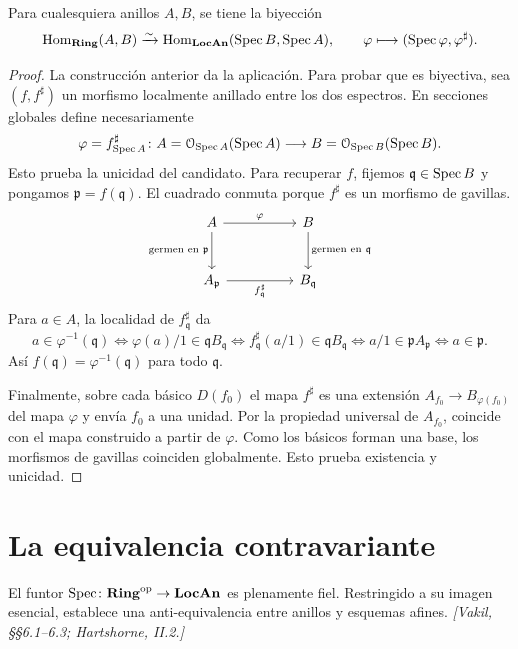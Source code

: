 \begin{teo}
\label{teo:s06-plena-fidelidad}
Para cualesquiera anillos $A,B$, se tiene la biyección
\[
\operatorname{Hom}_{\mathbf{Ring}}(A,B)\xrightarrow{\sim}
\operatorname{Hom}_{\mathbf{LocAn}}(\operatorname{Spec} B,\operatorname{Spec} A),\qquad
\varphi\longmapsto(\operatorname{Spec}\varphi,\varphi^\sharp).
\]
\end{teo}
\begin{proof}
La construcción anterior da la aplicación. Para probar que es biyectiva, sea $(f,f^\sharp)$ un morfismo localmente anillado entre los dos espectros. En secciones globales define necesariamente
\[
\varphi=f^\sharp_{\operatorname{Spec} A}\colon A=\mathcal O_{\operatorname{Spec} A}(\operatorname{Spec} A)\longrightarrow
B=\mathcal O_{\operatorname{Spec} B}(\operatorname{Spec} B).
\]
Esto prueba la unicidad del candidato. Para recuperar $f$, fijemos $\mathfrak q\in\operatorname{Spec} B$ y pongamos $\mathfrak p=f(\mathfrak q)$. El cuadrado conmuta porque $f^\sharp$ es un morfismo de gavillas.
\[
\begin{tikzcd}[column sep=huge, row sep=large]
A \arrow[r,"\varphi"] \arrow[d,"\text{germen en }\mathfrak p"'] & B \arrow[d,"\text{germen en }\mathfrak q"] \\
A_{\mathfrak p} \arrow[r,"f^\sharp_{\mathfrak q}"'] & B_{\mathfrak q}
\end{tikzcd}
\]
Para $a\in A$, la localidad de $f^\sharp_{\mathfrak q}$ da
\[
a\in\varphi^{-1}(\mathfrak q)
\iff \varphi(a)/1\in\mathfrak qB_{\mathfrak q}
\iff f^\sharp_{\mathfrak q}(a/1)\in\mathfrak qB_{\mathfrak q}
\iff a/1\in\mathfrak pA_{\mathfrak p}
\iff a\in\mathfrak p.
\]
Así $f(\mathfrak q)=\varphi^{-1}(\mathfrak q)$ para todo $\mathfrak q$.

Finalmente, sobre cada básico $D(f_0)$ el mapa $f^\sharp$ es una extensión $A_{f_0}\to B_{\varphi(f_0)}$ del mapa $\varphi$ y envía $f_0$ a una unidad. Por la propiedad universal de $A_{f_0}$, coincide con el mapa construido a partir de $\varphi$. Como los básicos forman una base, los morfismos de gavillas coinciden globalmente. Esto prueba existencia y unicidad.
\end{proof}

\section{La equivalencia contravariante}
\label{sec:s06-equivalencia}

\begin{coro}[La equivalencia]
\label{coro:s06-equivalencia}
El funtor $\operatorname{Spec}\colon \mathbf{Ring}^{\mathrm{op}}\to\mathbf{LocAn}$ es plenamente fiel. Restringido a su imagen esencial, establece una anti-equivalencia entre anillos y esquemas afines. \emph{[Vakil, \S\S6.1--6.3; Hartshorne, II.2.]}
\end{coro}


